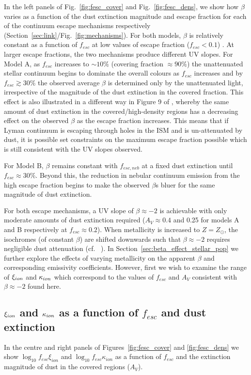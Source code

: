 In the left panels of Fig.~\ref{fig:fesc_cover} and Fig.~\ref{fig:fesc_dens}, we show how $\beta$ varies as a function of the dust extinction magnitude and escape fraction for each of the continuum escape mechanisms respectively (Section~\ref{sec:link}/Fig.~\ref{fig:mechanisms}). For both models, $\beta$ is relatively constant as a function of $f_{esc}$ at low values of escape fraction ($f_{esc} < 0.1$) . At larger escape fractions, the two mechanisms produce different UV slopes. For Model A, as $f_{esc}$ increases to $\sim10\%$ (covering fraction $\approx 90\%$) the unattenuated stellar continuum begins to dominate the overall colours as $f_{esc}$ increases and by $f_{esc} \gtrsim 30\%$ the observed average $\beta$ is determined only by the unattenuated light, irrespective of the magnitude of the dust extinction in the covered fraction. This effect is also illustrated in a different way in Figure 9 of \citet{Zackrisson:2013iz}, whereby the same amount of dust extinction in the covered/high-density regions has a decreasing effect on the observed $\beta$ as the escape fraction increases. This means that if Lyman continuum is escaping through holes in the ISM and is un-attenuated by dust, it is possible set constraints on the maximum escape fraction possible which is still consistent with the UV slopes observed.

For Model B, $\beta$ remains constant with $f_{esc,neb}$ at a fixed dust extinction until $f_{esc} \approx 30\%$. Beyond this, the reduction in nebular continuum emission from the high escape fraction begins to make the observed $\beta$s bluer for the same magnitude of dust extinction.

For both escape mechanisms, a UV slope of $\beta \approx -2$ is achievable with only moderate amounts of dust extinction required ($A_{V} \approx 0.4$ and 0.25 for models A and B respectively at $f_{esc}\approx 0.2$). When metallicity is increased to $Z = Z_{\odot}$, the isochromes (of constant $\beta$) are shifted downwards such that $\beta \approx -2$ requires negligible dust attenuation (cf. \citeauthor{Robertson:2013ji}~\citeyear{Robertson:2013ji}). In Section~\ref{sec:beta_effect_stellar_pop} we further explore the effects of varying metallicity on the apparent $\beta$ and corresponding emissivity coefficients. However, first we wish to examine the range of $\xi_{\lowercase{ion}}$ and $\kappa_{\lowercase{ion}}$ which correspond to the values of $f_{esc}$ and $A_{V}$ consistent with $\beta \approx -2$ found here.

\subsection{$\xi_{\lowercase{ion}}$ and $\kappa_{\lowercase{ion}}$ as a function of $f_{esc}$ and dust extinction}
In the centre and right panels of Figures~\ref{fig:fesc_cover} and \ref{fig:fesc_dens} we show $\log_{10}f_{esc}\xi_{ion}$ and $\log_{10}f_{esc}\kappa_{ion}$ as a function of $f_{esc}$ and the extinction magnitude of dust in the covered regions ($A_{V}$).


